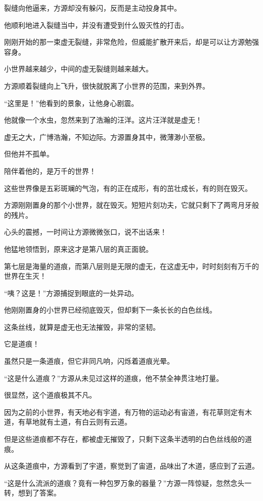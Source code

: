\begin{this_body}
裂缝向他逼来，方源却没有躲闪，反而是主动投身其中。

他顺利地进入裂缝当中，并没有遭受到什么毁灭性的打击。

刚刚开始的那一束虚无裂缝，非常危险，但威能扩散开来后，却是可以让方源勉强容身。

小世界越来越少，中间的虚无裂缝则越来越大。

方源顺着裂缝向上飞升，很快就脱离了小世界的范围，来到外界。

“这里是！”他看到的景象，让他身心剧震。

他就像一个水虫，忽然来到了浩瀚的汪洋。这片汪洋就是虚无！

虚无之大，广博浩瀚，不知边际。方源置身其中，微薄渺小至极。

但他并不孤单。

陪伴着他的，是万千的世界！

这些世界像是五彩斑斓的气泡，有的正在成形，有的茁壮成长，有的则在毁灭。

方源刚刚置身的那个小世界，就在毁灭。短短片刻功夫，它就只剩下了两弯月牙般的残片。

心头的震撼，一时间让方源微微张口，说不出话来！

他猛地领悟到，原来这才是第八层的真正面貌。

第七层是海量的道痕，而第八层则是无限的虚无，在这虚无中，时时刻刻有万千的世界在生灭！

“咦？这是！”方源捕捉到眼底的一处异动。

他刚刚置身的小世界已经彻底毁灭，但却剩下一条长长的白色丝线。

这条丝线，就算是虚无也无法摧毁，非常的坚韧。

它是道痕！

虽然只是一条道痕，但它非同凡响，闪烁着道痕光晕。

“这是什么道痕？”方源从未见过这样的道痕，他不禁全神贯注地打量。

很显然，这个道痕极其不凡。

因为之前的小世界，有天地必有宇道，有万物的运动必有宙道，有花草则定有木道，有草地就有土道，有白云则有云道。

但是这些道痕都不存在，都被虚无摧毁了，只剩下这条半透明的白色丝线般的道痕。

从这条道痕中，方源看到了宇道，察觉到了宙道，品味出了木道，感应到了云道。

“这是什么流派的道痕？竟有一种包罗万象的器量？”方源一阵惊疑，忽然念头一转，想到了答案。


\end{this_body}
